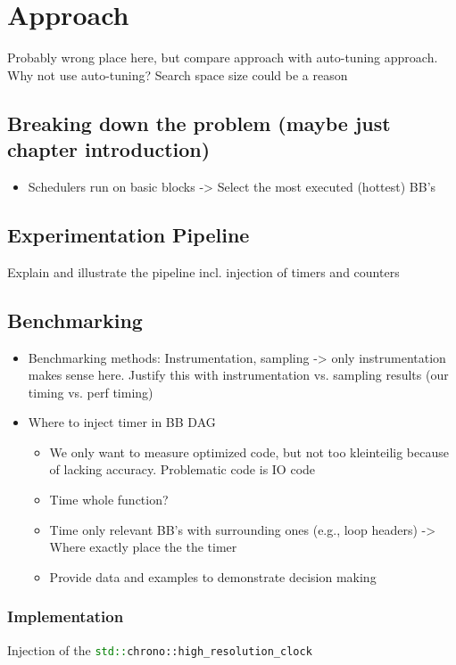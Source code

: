 \chapter{Approach}
Probably wrong place here, but compare approach with auto-tuning approach.
Why not use auto-tuning? Search space size could be a reason

\section{Breaking down the problem (maybe just chapter introduction)}
\begin{itemize}
    \item Schedulers run on basic blocks -> Select the most executed (hottest) BB's
\end{itemize}

\section{Experimentation Pipeline}
Explain and illustrate the pipeline incl. injection of timers and counters

\section{Benchmarking}
\begin{itemize}
    \item Benchmarking methods: Instrumentation, sampling -> only instrumentation makes sense here. Justify this with instrumentation vs. sampling results (our timing vs. perf timing)
    \item Where to inject timer in BB DAG
    \begin{itemize}
        \item We only want to measure optimized code, but not too kleinteilig because of lacking accuracy. Problematic code is IO code
        \item Time whole function?
        \item Time only relevant BB's with surrounding ones (e.g., loop headers) -> Where exactly place the the timer
        \item Provide data and examples to demonstrate decision making
    \end{itemize} 
\end{itemize}
\subsection{Implementation}
Injection of the \lstinline[language=C++]|std::chrono::high_resolution_clock|
